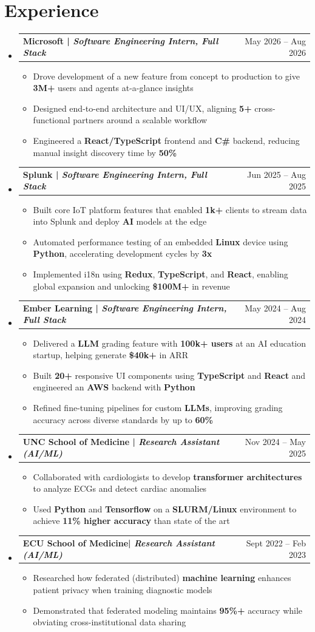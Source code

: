 \documentclass[letterpaper,11pt]{article}
\makeatletter
\newcommand{\resumeItem}[1]{
  \item\small{
    {#1 \vspace{-2pt}}}
}
\newcommand{\resumeSubheading}[2]{
  \vspace{-2pt}\item
    \begin{tabular*}{0.97\textwidth}[t]{l@{\extracolsep{\fill}}r}
      \textbf{#1} & #2 \\
    \end{tabular*}
    \vspace{-7pt}
}
\newcommand{\resumeSubHeadingListStart}{\begin{itemize}[leftmargin=0.15in, label={}]}
\newcommand{\resumeSubHeadingListEnd}{\end{itemize}}
\newcommand{\resumeItemListStart}{\begin{itemize}[leftmargin=0.15in]}
\newcommand{\resumeItemListEnd}{\end{itemize}\vspace{-5pt}}
\makeatother
\begin{document}
\section{Experience}
  \resumeSubHeadingListStart
  \resumeSubheading
  {\textbf{Microsoft }|\textit{ Software Engineering Intern, Full Stack}}{May 2026 -- Aug 2026}
  \resumeItemListStart
\resumeItem{Drove development of a new feature from concept to production to give \textbf{3M+} users and agents at-a-glance insights}
\resumeItem{Designed end-to-end architecture and UI/UX, aligning \textbf{5+} cross-functional partners around a scalable workflow}
\resumeItem{Engineered a \textbf{React/TypeScript} frontend and \textbf{C\#} backend, reducing manual insight discovery time by \textbf{50\%}}
    \resumeItemListEnd
  \resumeSubheading
  {\textbf{Splunk }|\textit{ Software Engineering Intern, Full Stack}}{Jun 2025 -- Aug 2025}
  \resumeItemListStart
    \resumeItem{Built core IoT platform features that enabled \textbf{1k+} clients to stream data into Splunk and deploy \textbf{AI} models at the edge}
    \resumeItem{Automated performance testing of an embedded \textbf{Linux} device using \textbf{Python}, accelerating development cycles by \textbf{3x}}
    \resumeItem{Implemented i18n using \textbf{Redux}, \textbf{TypeScript}, and \textbf{React}, enabling global expansion and unlocking \textbf{\$100M+} in revenue}
    \resumeItemListEnd
    \resumeSubheading
      {\textbf{Ember Learning }|\textit{ Software Engineering Intern, Full Stack}}{May 2024 -- Aug 2024}
      \resumeItemListStart
        \resumeItem{Delivered a \textbf{LLM} grading feature with \textbf{100k+ users} at an AI education startup, helping generate \textbf{\$40k+} in ARR}
        \resumeItem{Built \textbf{20+} responsive UI components using \textbf{TypeScript} and \textbf{React} and engineered an \textbf{AWS} backend with \textbf{Python}}
        \resumeItem{Refined fine-tuning pipelines for custom \textbf{LLMs}, improving grading accuracy across diverse standards by up to \textbf{60\%}}
      \resumeItemListEnd
      \resumeSubheading
      {\textbf{UNC School of Medicine }|\textit{ Research Assistant (AI/ML)}}{ Nov 2024 -- May 2025}
      \resumeItemListStart
        \resumeItem{Collaborated with cardiologists to develop \textbf{transformer architectures} to analyze ECGs and detect cardiac anomalies}
        \resumeItem{Used \textbf{Python} and \textbf{Tensorflow} on a \textbf{SLURM/Linux} environment to achieve \textbf{11\% higher accuracy} than state of the art}
      \resumeItemListEnd
      \resumeSubheading
      {\textbf{ECU School of Medicine}|\textit{ Research Assistant (AI/ML)}}{Sept 2022 -- Feb 2023}
      \resumeItemListStart
        \resumeItem{Researched how federated (distributed) \textbf{machine learning} enhances patient privacy when training diagnostic models}
        \resumeItem{Demonstrated that federated modeling maintains \textbf{95\%+} accuracy while obviating cross-institutional data sharing}
      \resumeItemListEnd
  \resumeSubHeadingListEnd
\end{document}
